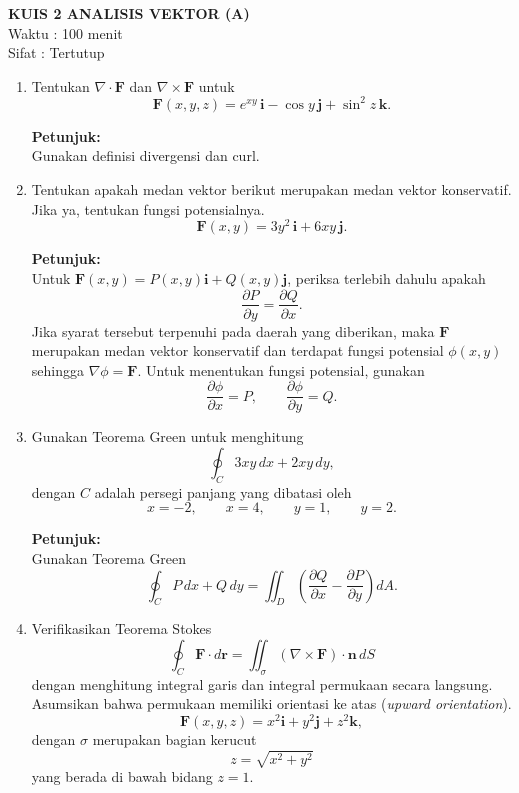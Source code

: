 \documentclass[11pt,letterpaper]{article}
\newcommand{\ihat}{\mathbf{i}}
\newcommand{\jhat}{\mathbf{j}}
\newcommand{\khat}{\mathbf{k}}
\begin{document}

\begin{center}
  \textbf{\Large KUIS 2 ANALISIS VEKTOR (A)}\\
  Waktu : 100 menit\\
  Sifat : Tertutup
\end{center}

\vspace{0.5cm}

\begin{enumerate}
  \item Tentukan $\nabla \cdot \mathbf{F}$ dan $\nabla \times \mathbf{F}$ untuk
        \[
          \mathbf{F}(x,y,z)=e^{xy}\,\ihat-\cos y\,\jhat+\sin^2 z\,\khat.
        \]

        \textbf{Petunjuk:}\\
        Gunakan definisi divergensi dan curl.

  \item Tentukan apakah medan vektor berikut merupakan medan vektor konservatif. Jika ya, tentukan fungsi potensialnya.
        \[
          \mathbf{F}(x,y)=3y^2\,\ihat+6xy\,\jhat.
        \]

        \textbf{Petunjuk:}\\
        Untuk $\mathbf{F}(x,y)=P(x,y)\ihat+Q(x,y)\jhat$, periksa terlebih dahulu apakah
        \[
          \frac{\partial P}{\partial y}=\frac{\partial Q}{\partial x}.
        \]
        Jika syarat tersebut terpenuhi pada daerah yang diberikan, maka $\mathbf{F}$ merupakan medan vektor konservatif dan terdapat fungsi potensial $\phi(x,y)$ sehingga $\nabla \phi=\mathbf{F}$. Untuk menentukan fungsi potensial, gunakan
        \[
          \frac{\partial \phi}{\partial x}=P,
          \qquad
          \frac{\partial \phi}{\partial y}=Q.
        \]

  \item Gunakan Teorema Green untuk menghitung
        \[
          \oint_C 3xy\,dx+2xy\,dy,
        \]
        dengan $C$ adalah persegi panjang yang dibatasi oleh
        \[
          x=-2,\qquad x=4,\qquad y=1,\qquad y=2.
        \]

        \textbf{Petunjuk:}\\
        Gunakan Teorema Green
        \[
          \oint_C P\,dx+Q\,dy
          =
          \iint_D
          \left(
          \frac{\partial Q}{\partial x}
          -
          \frac{\partial P}{\partial y}
          \right)dA.
        \]

  \item Verifikasikan Teorema Stokes
        \[
          \oint_C \mathbf{F}\cdot d\mathbf{r}
          =
          \iint_\sigma (\nabla \times \mathbf{F})\cdot \mathbf{n}\,dS
        \]
        dengan menghitung integral garis dan integral permukaan secara langsung. Asumsikan bahwa permukaan memiliki orientasi ke atas (\textit{upward orientation}).
        \[
          \mathbf{F}(x,y,z)=x^2\ihat+y^2\jhat+z^2\khat,
        \]
        dengan $\sigma$ merupakan bagian kerucut
        \[
          z=\sqrt{x^2+y^2}
        \]
        yang berada di bawah bidang $z=1$.


\end{enumerate}
\end{document}
